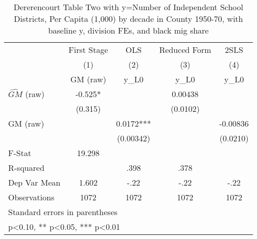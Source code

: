\begin{table}[htbp]\centering
\def\sym#1{\ifmmode^{#1}\else\(^{#1}\)\fi}
\caption{Dererencourt Table Two with y=Number of Independent School Districts, Per Capita (1,000) by decade in County 1950-70, with baseline y, division FEs, and black mig share}
\begin{tabular}{l*{4}{c}}
\toprule
                    & First Stage   &         OLS   &Reduced Form   &        2SLS   \\
                    &\multicolumn{1}{c}{(1)}&\multicolumn{1}{c}{(2)}&\multicolumn{1}{c}{(3)}&\multicolumn{1}{c}{(4)}\\
                    &\multicolumn{1}{c}{GM  (raw)}&\multicolumn{1}{c}{y\_L0}&\multicolumn{1}{c}{y\_L0}&\multicolumn{1}{c}{y\_L0}\\
\midrule
$\hat{GM}$ (raw)    &      -0.525*  &               &     0.00438   &               \\
                    &     (0.315)   &               &    (0.0102)   &               \\
\addlinespace
GM  (raw)           &               &      0.0172***&               &    -0.00836   \\
                    &               &   (0.00342)   &               &    (0.0210)   \\
\midrule
F-Stat              &      19.298   &               &               &               \\
R-squared           &               &        .398   &        .378   &               \\
Dep Var Mean        &       1.602   &        -.22   &        -.22   &        -.22   \\
Observations        &        1072   &        1072   &        1072   &        1072   \\
\bottomrule
\multicolumn{5}{l}{\footnotesize Standard errors in parentheses}\\
\multicolumn{5}{l}{\footnotesize * p<0.10, ** p<0.05, *** p<0.01}\\
\end{tabular}
\end{table}
